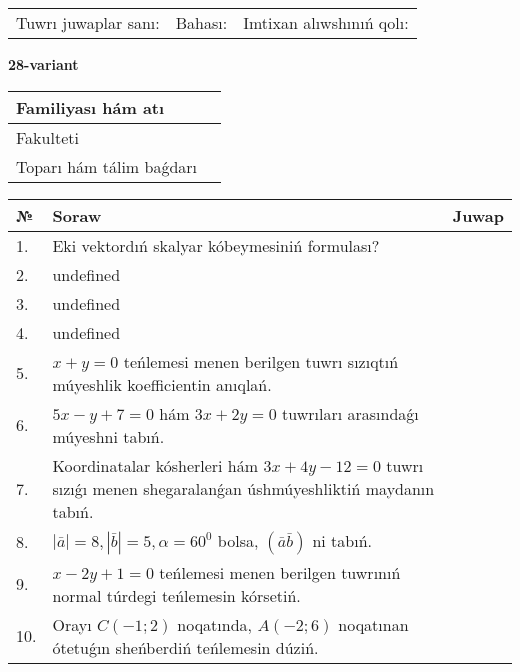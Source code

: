 \documentclass{article}
\begin{document}
\vspace{0.7cm}

\begin{tabular}{lll}
Tuwrı juwaplar sanı: \underline{\hspace{1cm}} & 
Bahası: \underline{\hspace{1cm}} & 
Imtixan alıwshınıń qolı: \underline{\hspace{2cm}} \\
\end{tabular}

\egroup

\newpage


\textbf{28-variant}\\

\bgroup
\def\arraystretch{1.6} %

\begin{tabular}{|m{5.7cm}|m{9.5cm}|}
\hline
Familiyası hám atı & \\
\hline
Fakulteti  & \\
\hline
Toparı hám tálim baǵdarı  & \\
\hline
\end{tabular}

\vspace{0.7cm}

\begin{tabular}{|m{0.7cm}|m{10cm}|m{4cm}|}
\hline
№ & Soraw & Juwap \\
\hline
1. & Eki vektordıń skalyar kóbeymesiniń formulası? &  \\
\hline
2. & undefined &  \\
\hline
3. & undefined &  \\
\hline
4. & undefined &  \\
\hline
5. & \(x + y = 0\) teńlemesi menen berilgen tuwrı sızıqtıń múyeshlik koefficientin anıqlań. &  \\
\hline
6. & \(5 x - y + 7 = 0\) hám \(3 x + 2 y = 0\) tuwrıları arasındaǵı múyeshni tabıń. &  \\
\hline
7. & Koordinatalar kósherleri hám \( 3 x + 4 y - 12 = 0 \) tuwrı sızıǵı menen shegaralanǵan úshmúyeshliktiń maydanın tabıń. &  \\
\hline
8. & \(\left| \bar{a} \right| = 8, \left| \bar{b} \right| = 5, \alpha = 60^{0}\) bolsa, \(( \bar{a}\bar{b} )\) ni tabıń. &  \\
\hline
9. & \(x - 2 y + 1 = 0\) teńlemesi menen berilgen tuwrınıń normal túrdegi teńlemesin kórsetiń. &  \\
\hline
10. & Orayı \(C (- 1;2)\) noqatında, \(A (- 2;6 )\) noqatınan ótetuǵın sheńberdiń teńlemesin dúziń. & \\
\hline
\end{tabular}
\end{document}

